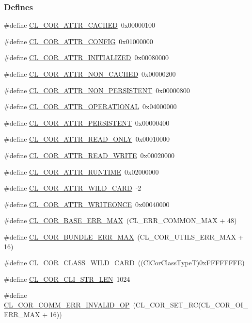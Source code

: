 \subsubsection*{Defines}
\begin{CompactItemize}
\item 
\#define \hyperlink{group__group13_ga310}{CL\_\-COR\_\-ATTR\_\-CACHED}~0x00000100
\item 
\#define \hyperlink{group__group13_ga303}{CL\_\-COR\_\-ATTR\_\-CONFIG}~0x01000000
\item 
\#define \hyperlink{group__group13_ga309}{CL\_\-COR\_\-ATTR\_\-INITIALIZED}~0x00080000
\item 
\#define \hyperlink{group__group13_ga311}{CL\_\-COR\_\-ATTR\_\-NON\_\-CACHED}~0x00000200
\item 
\#define \hyperlink{group__group13_ga313}{CL\_\-COR\_\-ATTR\_\-NON\_\-PERSISTENT}~0x00000800
\item 
\#define \hyperlink{group__group13_ga305}{CL\_\-COR\_\-ATTR\_\-OPERATIONAL}~0x04000000
\item 
\#define \hyperlink{group__group13_ga312}{CL\_\-COR\_\-ATTR\_\-PERSISTENT}~0x00000400
\item 
\#define \hyperlink{group__group13_ga306}{CL\_\-COR\_\-ATTR\_\-READ\_\-ONLY}~0x00010000
\item 
\#define \hyperlink{group__group13_ga307}{CL\_\-COR\_\-ATTR\_\-READ\_\-WRITE}~0x00020000
\item 
\#define \hyperlink{group__group13_ga304}{CL\_\-COR\_\-ATTR\_\-RUNTIME}~0x02000000
\item 
\#define \hyperlink{group__group13_ga297}{CL\_\-COR\_\-ATTR\_\-WILD\_\-CARD}~-2
\item 
\#define \hyperlink{group__group13_ga308}{CL\_\-COR\_\-ATTR\_\-WRITEONCE}~0x00040000
\item 
\#define \hyperlink{group__group13_ga191}{CL\_\-COR\_\-BASE\_\-ERR\_\-MAX}~(CL\_\-ERR\_\-COMMON\_\-MAX + 48)
\item 
\#define \hyperlink{group__group13_ga246}{CL\_\-COR\_\-BUNDLE\_\-ERR\_\-MAX}~(CL\_\-COR\_\-UTILS\_\-ERR\_\-MAX + 16)
\item 
\#define \hyperlink{group__group13_ga291}{CL\_\-COR\_\-CLASS\_\-WILD\_\-CARD}~((\hyperlink{group__group13_ga2}{Cl\-Cor\-Class\-Type\-T})0x\-FFFFFFFE)
\item 
\#define \hyperlink{group__group13_ga286}{CL\_\-COR\_\-CLI\_\-STR\_\-LEN}~1024
\item 
\#define \hyperlink{group__group13_ga259}{CL\_\-COR\_\-COMM\_\-ERR\_\-INVALID\_\-OP}~(CL\_\-COR\_\-SET\_\-RC(CL\_\-COR\_\-OI\_\-ERR\_\-MAX + 16))

\end{CompactItemize}
